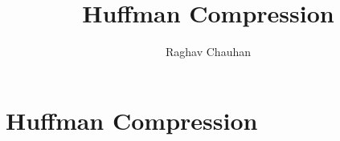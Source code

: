 \documentclass[10pt]{report}
\author{Raghav Chauhan}
\title{Huffman Compression}
\begin{document}
\chapter{Huffman Compression}

\inputminted{C}{../huffman.c}
\end{document}
